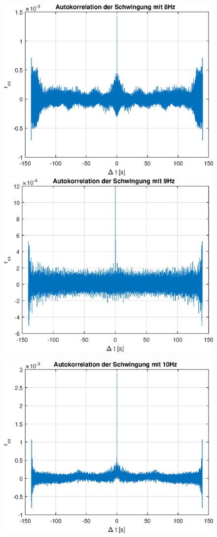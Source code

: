 \documentclass{article}
\begin{document}
\begin{figure}[!h]
\includegraphics[width=0.5\linewidth]{img/rxx_sinefreq_8}
\includegraphics[width=0.5\linewidth]{img/rxx_sinefreq_9}
\end{figure}
\begin{figure}[!h]
\centering
\includegraphics[width=0.5\linewidth]{img/rxx_sinefreq_10}
\end{figure}

\newpage
\end{document}
